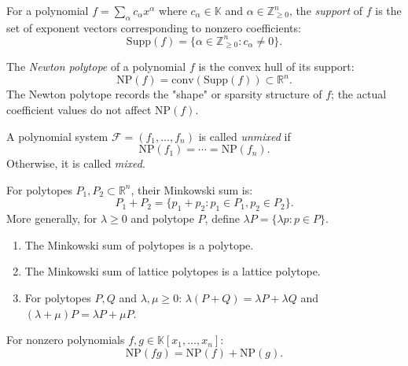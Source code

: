 \begin{definition}\label{def:support}
	For a polynomial $f = \sum_{\alpha} c_{\alpha} x^{\alpha}$ where $c_{\alpha} \in \mathbb{K}$ and $\alpha \in \mathbb{Z}_{\geq 0}^n$, the \emph{support} of $f$ is the set of exponent vectors corresponding to nonzero coefficients:
	\[\text{Supp}(f) = \{\alpha \in \mathbb{Z}_{\geq 0}^n : c_{\alpha} \neq 0\}.\]
\end{definition}

\begin{definition}\label{def:newton}
	The \emph{Newton polytope} of a polynomial $f$ is the convex hull of its support:
	\[\text{NP}(f) = \text{conv}(\text{Supp}(f)) \subset \mathbb{R}^n.\]
	The Newton polytope records the "shape" or sparsity structure of $f$; the actual coefficient values do not affect $\text{NP}(f)$.
\end{definition}

\begin{definition}\label{def:mixed-unmixed}
	A polynomial system $\mathcal{F} = (f_1,\ldots,f_n)$ is called \emph{unmixed} if
	\[
	\mathrm{NP}(f_1)=\cdots=\mathrm{NP}(f_n).
	\]
	Otherwise, it is called \emph{mixed}.
\end{definition}


\begin{definition}\label{def:minkowski}
	For polytopes $P_1, P_2 \subset \mathbb{R}^n$, their {Minkowski sum} is:
	\[P_1 + P_2 = \{p_1 + p_2 : p_1 \in P_1, p_2 \in P_2\}.\]
	More generally, for $\lambda \geq 0$ and polytope $P$, define $\lambda P = \{\lambda p : p \in P\}$.
\end{definition}

\begin{proposition}
	\begin{enumerate}
		\item The Minkowski sum of polytopes is a polytope.
		\item The Minkowski sum of lattice polytopes is a lattice polytope.
		\item For polytopes $P, Q$ and $\lambda, \mu \geq 0$: $\lambda(P + Q) = \lambda P + \lambda Q$ and $(\lambda + \mu)P = \lambda P + \mu P$.
	\end{enumerate}
\end{proposition}

\begin{proposition}\label{prop:newton-product}
	For nonzero polynomials $f, g \in \mathbb{K}[x_1, \ldots, x_n]$:
	\[\text{NP}(fg) = \text{NP}(f) + \text{NP}(g).\]
\end{proposition}

